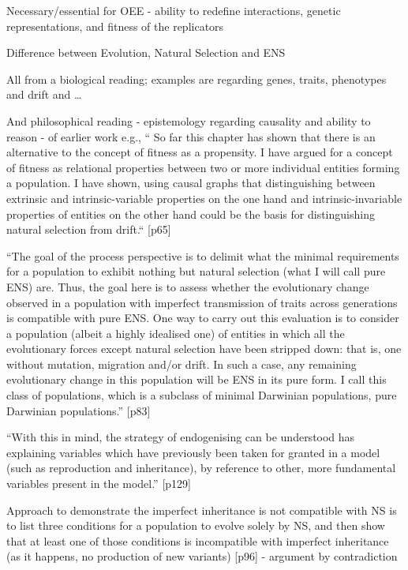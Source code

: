 	Necessary/essential for OEE - ability to redefine interactions,
	genetic representations, and fitness of the replicators

\autocite{Bourrat2015}


Difference between Evolution, Natural Selection and ENS


All from a biological reading; examples are regarding genes, traits,
phenotypes and drift and \ldots{}


And philosophical reading - epistemology regarding causality and
ability to reason - of earlier work e.g., `` So far this chapter has
shown that there is an alternative to the concept of fitness as a
propensity. I have argued for a concept of fitness as relational
properties between two or more individual entities forming a
population. I have shown, using causal graphs that distinguishing
between extrinsic and intrinsic-variable properties on the one hand
and intrinsic-invariable properties of entities on the other hand
could be the basis for distinguishing natural selection from
drift.`` {[}p65{]}
	

``The goal of the process perspective is to delimit what the minimal
requirements for a population to exhibit nothing but natural selection
(what I will call pure ENS) are. Thus, the goal here is to assess
whether the evolutionary change observed in a population with
imperfect transmission of traits across generations is compatible with
pure ENS. One way to carry out this evaluation is to consider a
population (albeit a highly idealised one) of entities in which all
the evolutionary forces except natural selection have been stripped
down: that is, one without mutation, migration and/or drift. In such a
case, any remaining evolutionary change in this population will be ENS
in its pure form. I call this class of populations, which is a
subclass of minimal Darwinian populations, pure Darwinian
populations.'' {[}p83{]}

``With this in mind, the strategy of endogenising can be understood
has explaining variables which have previously been taken for granted
in a model (such as reproduction and inheritance), by reference to
other, more fundamental variables present in the model.'' {[}p129{]}


Approach to demonstrate the imperfect inheritance is not compatible
with NS is to list three conditions for a population to evolve solely
by NS, and then show that at least one of those conditions is
incompatible with imperfect inheritance (as it happens, no production
of new variants) {[}p96{]} - argument by contradiction


